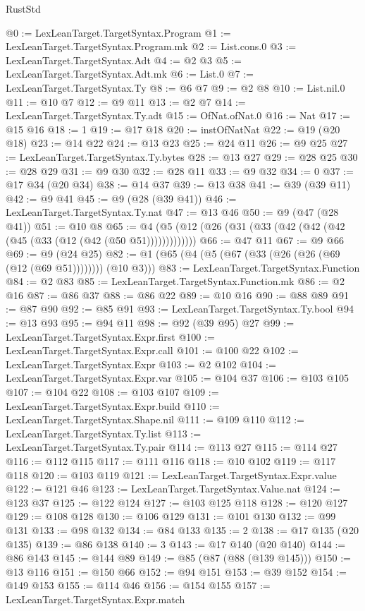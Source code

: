 \begin{lexlean}{RustStd}
\begin{coremodule}
{\begin{coremodule}
{{{{{{{{{{{{{{{{{{{{{{{{{{@0 := LexLeanTarget.TargetSyntax.Program
@1 := LexLeanTarget.TargetSyntax.Program.mk
@2 := List.cons.{0}
@3 := LexLeanTarget.TargetSyntax.Adt
@4 := @2 @3
@5 := LexLeanTarget.TargetSyntax.Adt.mk
@6 := List.{0}
@7 := LexLeanTarget.TargetSyntax.Ty
@8 := @6 @7
@9 := @2 @8
@10 := List.nil.{0}
@11 := @10 @7
@12 := @9 @11
@13 := @2 @7
@14 := LexLeanTarget.TargetSyntax.Ty.adt
@15 := OfNat.ofNat.{0}
@16 := Nat
@17 := @15 @16
@18 := 1
@19 := @17 @18
@20 := instOfNatNat
@22 := @19 (@20 @18)
@23 := @14 @22
@24 := @13 @23
@25 := @24 @11
@26 := @9 @25
@27 := LexLeanTarget.TargetSyntax.Ty.bytes
@28 := @13 @27
@29 := @28 @25
@30 := @28 @29
@31 := @9 @30
@32 := @28 @11
@33 := @9 @32
@34 := 0
@37 := @17 @34 (@20 @34)
@38 := @14 @37
@39 := @13 @38
@41 := @39 (@39 @11)
@42 := @9 @41
@45 := @9 (@28 (@39 @41))
@46 := LexLeanTarget.TargetSyntax.Ty.nat
@47 := @13 @46
@50 := @9 (@47 (@28 @41))
@51 := @10 @8
@65 := @4 (@5 (@12 (@26 (@31 (@33 (@42 (@42 (@42 (@45 (@33 (@12 (@42 (@50 @51)))))))))))))
@66 := @47 @11
@67 := @9 @66
@69 := @9 (@24 @25)
@82 := @1 (@65 (@4 (@5 (@67 (@33 (@26 (@26 (@69 (@12 (@69 @51)))))))) (@10 @3)))
@83 := LexLeanTarget.TargetSyntax.Function
@84 := @2 @83
@85 := LexLeanTarget.TargetSyntax.Function.mk
@86 := @2 @16
@87 := @86 @37
@88 := @86 @22
@89 := @10 @16
@90 := @88 @89
@91 := @87 @90
@92 := @85 @91
@93 := LexLeanTarget.TargetSyntax.Ty.bool
@94 := @13 @93
@95 := @94 @11
@98 := @92 (@39 @95) @27
@99 := LexLeanTarget.TargetSyntax.Expr.first
@100 := LexLeanTarget.TargetSyntax.Expr.call
@101 := @100 @22
@102 := LexLeanTarget.TargetSyntax.Expr
@103 := @2 @102
@104 := LexLeanTarget.TargetSyntax.Expr.var
@105 := @104 @37
@106 := @103 @105
@107 := @104 @22
@108 := @103 @107
@109 := LexLeanTarget.TargetSyntax.Expr.build
@110 := LexLeanTarget.TargetSyntax.Shape.nil
@111 := @109 @110
@112 := LexLeanTarget.TargetSyntax.Ty.list
@113 := LexLeanTarget.TargetSyntax.Ty.pair
@114 := @113 @27
@115 := @114 @27
@116 := @112 @115
@117 := @111 @116
@118 := @10 @102
@119 := @117 @118
@120 := @103 @119
@121 := LexLeanTarget.TargetSyntax.Expr.value
@122 := @121 @46
@123 := LexLeanTarget.TargetSyntax.Value.nat
@124 := @123 @37
@125 := @122 @124
@127 := @103 @125 @118
@128 := @120 @127
@129 := @108 @128
@130 := @106 @129
@131 := @101 @130
@132 := @99 @131
@133 := @98 @132
@134 := @84 @133
@135 := 2
@138 := @17 @135 (@20 @135)
@139 := @86 @138
@140 := 3
@143 := @17 @140 (@20 @140)
@144 := @86 @143
@145 := @144 @89
@149 := @85 (@87 (@88 (@139 @145)))
@150 := @13 @116
@151 := @150 @66
@152 := @94 @151
@153 := @39 @152
@154 := @149 @153
@155 := @114 @46
@156 := @154 @155
@157 := LexLeanTarget.TargetSyntax.Expr.match
}}}}}}}}}}}}}}}}}}}}}}}}}}
\end{coremodule}}
\end{coremodule}
\end{lexlean}

